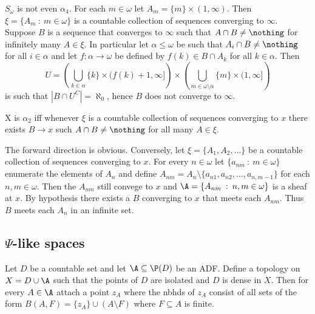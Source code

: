 \documentclass{article}
\begin{document}
\begin{exam}
    \(S_{\omega}\) is not even \(\alpha_4\). For each \(m \in \omega\) let \(A_m = \{m\} \times (1, \infty)\). Then \(\xi = \{A_m \: : \: m \in \omega\}\) is a countable collection of sequences converging to \(\infty\). Suppose \(B\) is a sequence that converges to \(\infty\) such that \(A\cap B \neq \nothing\) for infinitely many \(A \in \xi\). In particular let \(\alpha \leq \omega\) be such that \(A_i \cap B \neq \nothing\) for all \(i \in \alpha\) and let \(f:\alpha \to \omega\) be defined by \(f(k) \in B \cap A_k\) for all \(k \in \alpha\). Then 
    \[
    U = \left(\bigcup_{k \in \alpha} \{k\} \times (f(k) + 1, \infty]\right)\times \left(\bigcup_{m \in \omega\setminus\alpha} \{m\} \times (1, \infty]\right)\] 
    is such that \(|B \cap U^C| = \aleph_0\), hence \(B\) does not converge to \(\infty\). 

\end{exam}

\begin{exercise}
    X is \(\alpha_2\) iff whenever \(\xi\) is a countable collection of sequences converging to \(x\) there exists \(B \to x\) such \(A \cap B \neq \nothing\) for all many \(A \in \xi\).
\end{exercise}
\begin{soln}
    The forward direction is obvious. Conversely, let \(\xi =\{A_1, A_2, \dots\}\) be a countable collection of sequences converging to \(x\). For every \(n\in \omega\) let \(\{a_{nm} \: : \: m \in \omega\}\) enumerate the elements of \(A_n\) and define \(A_{nm} = A_n \setminus \{a_{n1}, a_{n2}, \dots, a_{n,m-1}\}\) for each \(n,m \in \omega\). Then the \(A_{nm}\) still convege to \(x\) and  \(\A = \{A_{nm} \: : \: n,m \in \omega \}\) is a sheaf at \(x\). By hypothesis there exists a \(B\) converging to \(x\) that meets each \(A_{nm}\). Thus \(B\) meets each \(A_n\) in an infinite set.
\end{soln}

\subsection{\(\Psi\)-like spaces}

\begin{defn}
    Let \(D\) be a countable set and let \(\A \subseteq \P(D)\) be an ADF. Define a topology on \(X = D \cup \A\) such that the points of \(D\) are isolated and \(D\) is dense in \(X\). Then for every \(A \in \A\) attach a point \(z_A\) where the nbhds of \(z_A\) consist of all sets of the form \(B(A, F) = \{z_A\} \cup (A \setminus F)\) where \(F \subseteq A\) is finite.
\end{defn}
\end{document}
